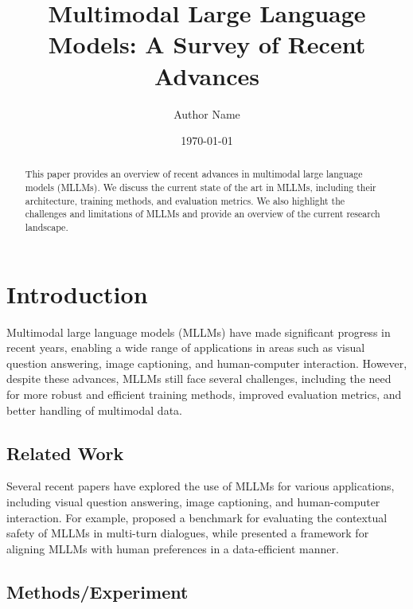 \documentclass{article}
\begin{document}
\title{Multimodal Large Language Models: A Survey of Recent Advances}

\author{Author Name}

\date{\today}

\maketitle

\begin{abstract}
This paper provides an overview of recent advances in multimodal large language models (MLLMs). We discuss the current state of the art in MLLMs, including their architecture, training methods, and evaluation metrics. We also highlight the challenges and limitations of MLLMs and provide an overview of the current research landscape.

\end{abstract}

\section{Introduction}

Multimodal large language models (MLLMs) have made significant progress in recent years, enabling a wide range of applications in areas such as visual question answering, image captioning, and human-computer interaction. However, despite these advances, MLLMs still face several challenges, including the need for more robust and efficient training methods, improved evaluation metrics, and better handling of multimodal data.

\subsection{Related Work}

Several recent papers have explored the use of MLLMs for various applications, including visual question answering, image captioning, and human-computer interaction. For example, \cite{liu2026mtmcsbenchevaluatingcontextualsafety} proposed a benchmark for evaluating the contextual safety of MLLMs in multi-turn dialogues, while \cite{zhu2026am3safetydataefficientalignment} presented a framework for aligning MLLMs with human preferences in a data-efficient manner.

\subsection{Methods/Experiment}
\end{document}
